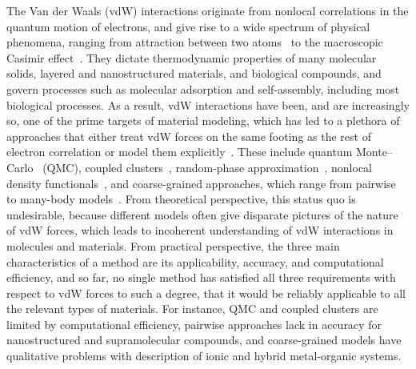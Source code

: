 

The Van der Waals (vdW) interactions originate from nonlocal correlations in the quantum motion of electrons, and give rise to a wide spectrum of physical phenomena, ranging from attraction between two atoms~\citep{LondonZP30} to the macroscopic Casimir effect~\citep{JaffePRD05}.
They dictate thermodynamic properties of many molecular solids, layered and nanostructured materials, and biological compounds, and govern processes such as molecular adsorption and self-assembly, including most biological processes.
As a result, vdW interactions have been, and are increasingly so, one of the prime targets of material modeling, which has led to a plethora of approaches that either treat vdW forces on the same footing as the rest of electron correlation or model them explicitly~\citep{KlimesJCP12,GrimmeCR16,HermannCR17}.
These include quantum Monte--Carlo~\citep{AmbrosettiJPCL14} (QMC), coupled clusters~\citep{YangS14}, random-phase approximation~\citep{LuPRL09}, nonlocal density functionals~\citep{DionPRL04,VydrovPRL09}, and coarse-grained approaches, which range from pairwise~\citep{GrimmeJCC04,BeckeJCP07,TkatchenkoPRL09} to many-body models~\citep{TkatchenkoPRL12,SilvestrelliJCP13}.
From theoretical perspective, this status quo is undesirable, because different models often give disparate pictures of the nature of vdW forces, which leads to incoherent understanding of vdW interactions in molecules and materials.
From practical perspective, the three main characteristics of a method are its applicability, accuracy, and computational efficiency, and so far, no single method has satisfied all three requirements with respect to vdW forces to such a degree, that it would be reliably applicable to all the relevant types of materials.
For instance, QMC and coupled clusters are limited by computational efficiency, pairwise approaches lack in accuracy for nanostructured and supramolecular compounds, and coarse-grained models have qualitative problems with description of ionic and hybrid metal-organic systems.

